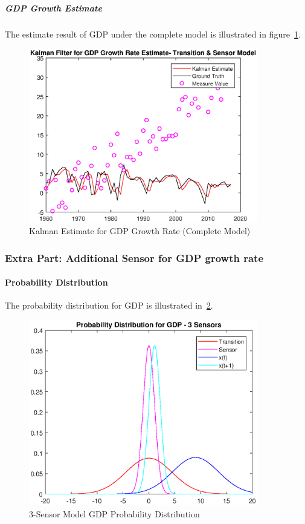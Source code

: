 \documentclass[11pt, a4paper]{article}
\begin{document}
\subparagraph{GDP Growth Estimate}

The estimate result of GDP under the complete model is illustrated in figure~\ref{fig:kf4}.

\begin{figure}[htbp]
	
	\centering 
	\includegraphics[width=10cm]{kf_1_4}
	
	\caption{Kalman Estimate for GDP Growth Rate (Complete Model)}
	\label{fig:kf4}
	
\end{figure}


\subsubsection{Extra Part: Additional Sensor for GDP growth rate }

\paragraph{Probability Distribution}

The probability distribution for GDP is illustrated in~\ref{fig:pd_3}.

\begin{figure}[htbp]
	
	\centering 
	\includegraphics[width=10cm]{pd_3}
	
	\caption{3-Sensor Model GDP Probability Distribution}
	\label{fig:pd_3}
	
\end{figure}
\end{document}
